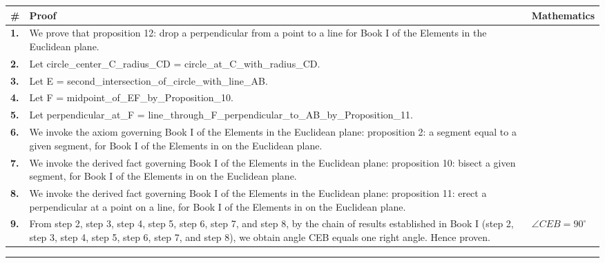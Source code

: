 \documentclass[11pt]{article}
\theoremstyle{definition}
\begin{document}
\begin{tabular}{@{} >{\raggedright\arraybackslash}p{} >{\raggedright\arraybackslash}p{} >{\raggedleft\arraybackslash}p{} @{}}
\textbf{\#} & \textbf{Proof} & \textbf{Mathematics} \\
\midrule
\textbf{1.} & We prove that proposition 12: drop a perpendicular from a point to a line for Book I of the Elements in the Euclidean plane. & \\[0.45em]
\textbf{2.} & Let circle\_center\_C\_radius\_CD = circle\_at\_C\_with\_radius\_CD. & \\[0.45em]
\textbf{3.} & Let E = second\_intersection\_of\_circle\_with\_line\_AB. & \\[0.45em]
\textbf{4.} & Let F = midpoint\_of\_EF\_by\_Proposition\_10. & \\[0.45em]
\textbf{5.} & Let perpendicular\_at\_F = line\_through\_F\_perpendicular\_to\_AB\_by\_Proposition\_11. & \\[0.45em]
\textbf{6.} & We invoke the axiom governing Book I of the Elements in the Euclidean plane: proposition 2: a segment equal to a given segment, for Book I of the Elements in on the Euclidean plane. & \\[0.45em]
\textbf{7.} & We invoke the derived fact governing Book I of the Elements in the Euclidean plane: proposition 10: bisect a given segment, for Book I of the Elements in on the Euclidean plane. & \\[0.45em]
\textbf{8.} & We invoke the derived fact governing Book I of the Elements in the Euclidean plane: proposition 11: erect a perpendicular at a point on a line, for Book I of the Elements in on the Euclidean plane. & \\[0.45em]
\textbf{9.} & From step 2, step 3, step 4, step 5, step 6, step 7, and step 8, by the chain of results established in Book I (step 2, step 3, step 4, step 5, step 6, step 7, and step 8), we obtain angle CEB equals one right angle. Hence proven. & $\displaystyle \angle CEB = 90^\circ$ \\[0.45em]
\bottomrule
\end{tabular}
\label{thm:Geometry-Euclid Book I-proposition_12_drop_a_perpendicular_from_a_point_to_a_line}
\par\medskip\hrule
\end{document}
